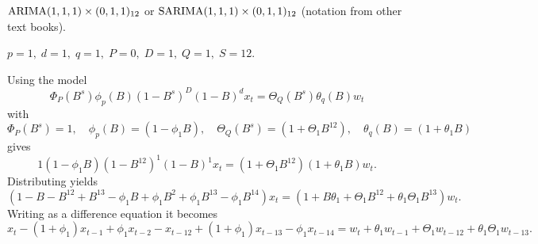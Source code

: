 $\operatorname{ARIMA}(1,1,1) \times (0,1,1)_{12}$ or $\operatorname{SARIMA}(1,1,1) \times (0,1,1)_{12}$ (notation from other text books).

\nl $p=1,\; d=1, \; q =1,\; P = 0, \; D=1,\; Q=1,\; S=12$.

Using the model $$\Phi_P(B^s) \phi_p(B)(1-B^s)^D(1-B)^d x_t = \Theta_Q(B^s)\theta_q(B) w_t$$
with 
$$\Phi_P(B^s) = 1, \quad \phi_p(B) = (1-\phi_1B), \quad \Theta_Q(B^s) = (1+\Theta_1 B^{12}), \quad \theta_q(B) = (1+\theta_1 B)$$
gives
$$1(1-\phi_1B)(1-B^{12})^1(1-B)^1x_t =  (1+\Theta_1 B^{12})  (1+\theta_1 B) w_t.$$
Distributing yields 
$$(1-B-B^{12}+B^{13}-\phi_1B + \phi_1 B^2 + \phi_1 B^{13} - \phi_1 B^{14})x_t = (1 + B\theta_1 + \Theta_1 B^{12} + \theta_1 \Theta_1 B^{13})w_t.$$
Writing as a difference equation it becomes
$$x_t - (1+\phi_1)x_{t-1} + \phi_1 x_{t-2} - x_{t-12} + (1+\phi_1)x_{t-13} - \phi_1 x_{t-14} = w_t + \theta_1 w_{t-1} + \Theta_1 w_{t-12} + \theta_1\Theta_1 w_{t-13}.$$
